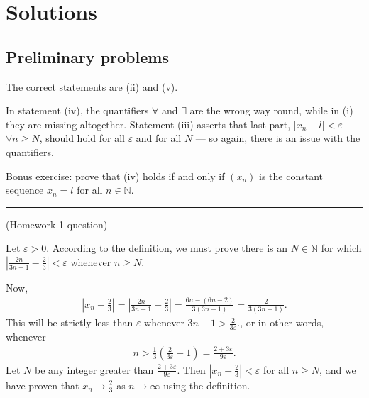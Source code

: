 \documentclass[letterpaper,10pt,english]{jupyterBook}
\begin{document}
\sphinxstepscope


\section{Solutions}
\label{\detokenize{Solutions-full:solutions}}\label{\detokenize{Solutions-full:sol}}\label{\detokenize{Solutions-full::doc}}

\subsection{Preliminary problems}
\label{\detokenize{Solutions-full:preliminary-problems}}
\sphinxAtStartPar
{\hyperref[\detokenize{Problems:p1}]{}}
The correct statements are (ii) and (v).

\sphinxAtStartPar
In statement (iv), the quantifiers \(\forall\) and \(\exists\) are the wrong way round, while in (i) they are missing altogether. Statement (iii) asserts that last part, \(|x_n-l|<\varepsilon\) \(\forall n\geq N\), should hold for all \(\varepsilon\) and for all \(N\) — so again, there is an issue with the quantifiers.

\sphinxAtStartPar
Bonus exercise: prove that (iv) holds if and only if \((x_n)\) is the constant sequence \(x_n=l\) for all \(n\in\mathbb{N}\).


\bigskip\hrule\bigskip


\sphinxAtStartPar
{\hyperref[\detokenize{Problems:p2}]{}} (Homework 1 question)

\sphinxAtStartPar
Let \(\varepsilon>0\). According to the definition, we must prove there is an \(N\in\mathbb{N}\) for which \(\left|\frac{2n}{3n-1}-\frac{2}{3}\right|<\varepsilon\) whenever \(n\geq N\).

\sphinxAtStartPar
Now,
\begin{equation*}
\begin{split}
\left|x_n-\frac{2}{3}\right| = \left|\frac{2n}{3n-1}-\frac{2}{3}\right| = \frac{6n-(6n-2)}{3(3n-1)} = \frac{2}{3(3n-1)}.
\end{split}
\end{equation*}
\sphinxAtStartPar
This will be strictly less than \(\varepsilon\) whenever \(3n-1>\frac{2}{3\varepsilon}\)., or in other words, whenever
\begin{equation*}
\begin{split}
n>\frac{1}{3}\left(\frac{2}{3\varepsilon}+1\right)=\frac{2+3\varepsilon}{9\varepsilon}.
\end{split}
\end{equation*}
\sphinxAtStartPar
Let \(N\) be any integer greater than \(\frac{2+3\varepsilon}{9\varepsilon}\). Then \(\left|x_n-\frac{2}{3}\right|<\varepsilon\) for all \(n\geq N\), and we have proven that \(x_n\rightarrow\frac{2}{3}\) as \(n\rightarrow\infty\) using the definition.
\end{document}
